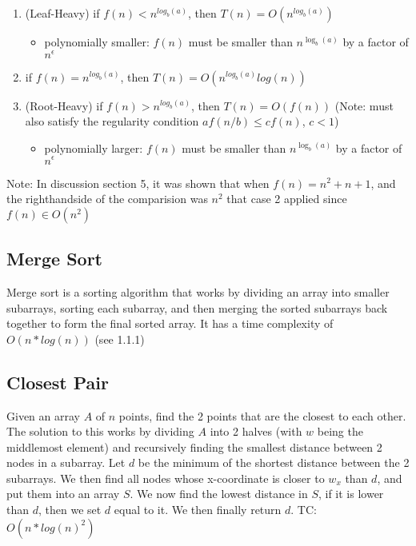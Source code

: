 \documentclass{article}
\begin{document}
\begin{enumerate}
    \item (Leaf-Heavy) if $f(n) < n^{log_b(a)}$, then  $T(n) = O(n^{log_b(a)})$
    \begin{itemize}
        \item polynomially smaller: $f(n)$ must be smaller than $n^{\log_b(a)}$ by a factor of $n^{\epsilon}$
    \end{itemize}
    \item if $f(n) = n^{log_b(a)}$, then $T(n) = O(n^{log_b(a)}log(n))$
    \item (Root-Heavy) if $f(n) > n^{log_b(a)}$, then $T(n) = O(f(n))$ (Note: must also satisfy the regularity condition $af(n/b) \leq cf(n)$, $c < 1$)
    \begin{itemize}
        \item polynomially larger: $f(n)$ must be smaller than $n^{\log_b(a)}$ by a factor of $n^{\epsilon}$
    \end{itemize}
\end{enumerate}

Note: In discussion section 5, it was shown that when $f(n) = n^2+n+1$, and the righthandside of the comparision was
$n^2$ that case 2 applied since $f(n) \in O(n^2)$


\subsection{Merge Sort}
Merge sort is a sorting algorithm that works by dividing an array into smaller subarrays, sorting each subarray, and then merging the sorted subarrays back together to form the final sorted array. It has a time complexity of $O(n*log(n))$ (see 1.1.1)

\subsection{Closest Pair}
Given an array $A$ of $n$ points, find the 2 points that are the closest to each other. 
The solution to this works by dividing $A$ into 2 halves (with $w$ being the middlemost element) and recursively finding the smallest
distance between 2 nodes in a subarray. Let $d$ be the minimum of the shortest distance between
the 2 subarrays. We then find all nodes whose x-coordinate is closer to $w_x$ than $d$, and
put them into an array $S$. We now find the lowest distance in $S$, if it is lower than $d$, 
then we set $d$ equal to it. We then finally return $d$. TC: $O(n*log(n)^2)$
\end{document}

